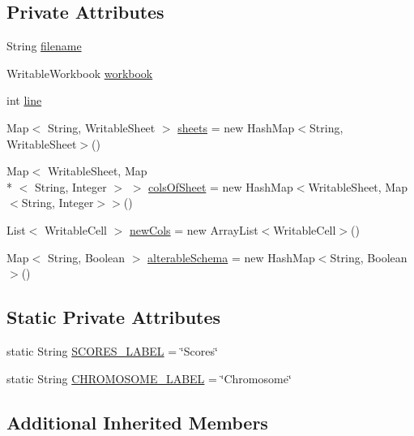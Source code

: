 \subsection*{Private Attributes}
\begin{DoxyCompactItemize}
\item 
String \hyperlink{classjenes_1_1utils_1_1_x_l_s_logger_a326448294f3d41ccfa5b80f496c7580e}{filename}
\item 
Writable\-Workbook \hyperlink{classjenes_1_1utils_1_1_x_l_s_logger_ad776c22f388365c6f1a8c21e786f9928}{workbook}
\item 
int \hyperlink{classjenes_1_1utils_1_1_x_l_s_logger_a2a9f48e370b1db8e0b978181bb7c5fec}{line}
\item 
Map$<$ String, Writable\-Sheet $>$ \hyperlink{classjenes_1_1utils_1_1_x_l_s_logger_a06bcfe322f856670f3706369261bc7c7}{sheets} = new Hash\-Map$<$String, Writable\-Sheet$>$()
\item 
Map$<$ Writable\-Sheet, Map\\*
$<$ String, Integer $>$ $>$ \hyperlink{classjenes_1_1utils_1_1_x_l_s_logger_a44fcfb206d65e2af727d24a8d4a0af31}{cols\-Of\-Sheet} = new Hash\-Map$<$Writable\-Sheet, Map$<$String, Integer$>$$>$()
\item 
List$<$ Writable\-Cell $>$ \hyperlink{classjenes_1_1utils_1_1_x_l_s_logger_a01b5b1ada6288ddd0f1753ccd5cc6df6}{new\-Cols} = new Array\-List$<$Writable\-Cell$>$()
\item 
Map$<$ String, Boolean $>$ \hyperlink{classjenes_1_1utils_1_1_x_l_s_logger_a9951ca6377e81a1c8a3c4b72d6a205f3}{alterable\-Schema} = new Hash\-Map$<$String, Boolean$>$()
\end{DoxyCompactItemize}
\subsection*{Static Private Attributes}
\begin{DoxyCompactItemize}
\item 
static String \hyperlink{classjenes_1_1utils_1_1_x_l_s_logger_a4fecf837647f44b8572a68f4cdedb458}{S\-C\-O\-R\-E\-S\-\_\-\-L\-A\-B\-E\-L} = \char`\"{}Scores\char`\"{}
\item 
static String \hyperlink{classjenes_1_1utils_1_1_x_l_s_logger_a7308e8bb6eda1c5bf2aef93c2607ce60}{C\-H\-R\-O\-M\-O\-S\-O\-M\-E\-\_\-\-L\-A\-B\-E\-L} = \char`\"{}Chromosome\char`\"{}
\end{DoxyCompactItemize}
\subsection*{Additional Inherited Members}


